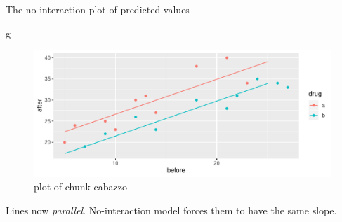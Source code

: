 \documentclass[ignorenonframetext,]{beamer}
\newenvironment{Shaded}{\begin{snugshade}}{\end{snugshade}}
\newcommand{\NormalTok}[1]{#1}
\begin{document}
\begin{frame}[fragile]{The no-interaction plot of predicted values}
\protect\hypertarget{the-no-interaction-plot-of-predicted-values}{}

\begin{Shaded}
\begin{Highlighting}[]
\NormalTok{g}
\end{Highlighting}
\end{Shaded}

\begin{figure}
\centering
\includegraphics{figure/cabazzo-1.pdf}
\caption{plot of chunk cabazzo}
\end{figure}

Lines now \emph{parallel}. No-interaction model forces them to have the
same slope.

\end{frame}
\end{document}
